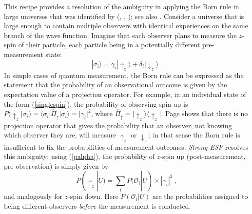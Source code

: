\documentclass[onecolumn,secnumarabic,amsmath,amssymb,balancelastpage,nofootinbib]{article}
\newcommand{\calo}{{\mathcal O}}
\begin{document}
This recipe provides a resolution of the ambiguity in applying the Born rule in large universes that was identified by \citeauthor{Page:2009qe} (\citeyear{Page:2009qe}, \citeyear{Page:2009mb}, \citeyear{Page:2010bj}); see also \citep{Aguirre:2010rw,Albrecht:2012zp}. Consider a universe that is large enough to contain multiple observers  with identical experiences on the same branch of the wave function. Imagine that each observer plans to measure the $z$-spin of their particle, each particle being in a potentially different pre-measurement state:
\begin{equation}
  |\sigma_i\rangle = \gamma_i|\uparrow_z\rangle + \delta_i|\downarrow_z\rangle\ .
  \label{singlespin}
\end{equation}
In simple cases of quantum measurement, the Born rule can be expressed as the statement that the probability of an observational outcome is given by the expectation value of a projection operator. For example, in an individual state of the form (\ref{singlespin}), the probability of observing spin-up is $P({\uparrow_z}|\sigma_i) = \langle\sigma_i|\hat{\Pi}_\uparrow|\sigma_i\rangle = |\gamma_i|^2$, where $\hat{\Pi}_\uparrow = |{\uparrow_z}\rangle\langle {\uparrow_z}|$. Page shows that there is no projection operator that gives the probability that an observer, not knowing which observer they are, will measure $\uparrow_z$ or $\downarrow_z$; in that sense the Born rule is insufficient to fix the probabilities of measurement outcomes. \emph{Strong ESP} resolves this ambiguity; using (\ref{palpha}), the probability of $z$-spin up (post-measurement, pre-observation) is simply given by
\begin{equation}
  P({\uparrow_z}|U) = \sum_i P(\calo_i|U)\times|\gamma_i|^2\ ,
\end{equation}
and analogously for $z$-spin down.  Here $P(\calo_i|U)$ are the probabilities assigned to being different observers \emph{before} the measurement is conducted.
\end{document}
